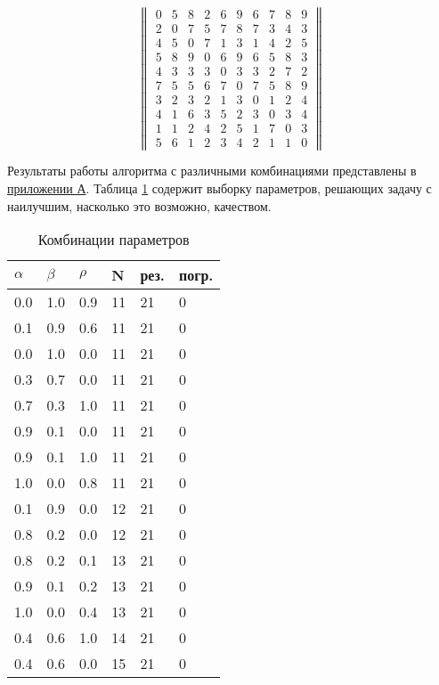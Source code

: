 \begin{equation}\label{math:class1}
    \begin{Vmatrix}
        0 & 5 & 8 & 2 & 6 & 9 & 6 & 7 & 8 & 9 \\
        2 & 0 & 7 & 5 & 7 & 8 & 7 & 3 & 4 & 3 \\
        4 & 5 & 0 & 7 & 1 & 3 & 1 & 4 & 2 & 5 \\
        5 & 8 & 9 & 0 & 6 & 9 & 6 & 5 & 8 & 3 \\
        4 & 3 & 3 & 3 & 0 & 3 & 3 & 2 & 7 & 2 \\
        7 & 5 & 5 & 6 & 7 & 0 & 7 & 5 & 8 & 9 \\
        3 & 2 & 3 & 2 & 1 & 3 & 0 & 1 & 2 & 4 \\
        4 & 1 & 6 & 3 & 5 & 2 & 3 & 0 & 3 & 4 \\
        1 & 1 & 2 & 4 & 2 & 5 & 1 & 7 & 0 & 3 \\
        5 & 6 & 1 & 2 & 3 & 4 & 2 & 1 & 1 & 0
    \end{Vmatrix} 
\end{equation}

Результаты работы алгоритма с различными комбинациями представлены в \hyperref[sec:fig1]{приложении А}. Таблица \ref{tab:class1} содержит выборку параметров, решающих задачу с наилучшим, насколько это возможно, качеством.

\begin{table}[!h]
\centering
    \caption{Комбинации параметров}
    \renewcommand{\arraystretch}{1.15}
    \begin{tabular}{||p{}p{}p{}p{}p{}p{}||}
        \hline
        $\alpha$ & $\beta$ & $\rho$ & N & рез. & погр. \\ \hline\hline
        0.0 & 1.0 & 0.9 & 11 & 21 & 0 \\ 
        0.1 & 0.9 & 0.6 & 11 & 21 & 0 \\ 
        0.0 & 1.0 & 0.0 & 11 & 21 & 0 \\ 
        0.3 & 0.7 & 0.0 & 11 & 21 & 0 \\ 
        0.7 & 0.3 & 1.0 & 11 & 21 & 0 \\ 
        0.9 & 0.1 & 0.0 & 11 & 21 & 0 \\ 
        0.9 & 0.1 & 1.0 & 11 & 21 & 0 \\ 
        1.0 & 0.0 & 0.8 & 11 & 21 & 0 \\ 
        0.1 & 0.9 & 0.0 & 12 & 21 & 0 \\ 
        0.8 & 0.2 & 0.0 & 12 & 21 & 0 \\ 
        0.8 & 0.2 & 0.1 & 13 & 21 & 0 \\ 
        0.9 & 0.1 & 0.2 & 13 & 21 & 0 \\ 
        1.0 & 0.0 & 0.4 & 13 & 21 & 0 \\ 
        0.4 & 0.6 & 1.0 & 14 & 21 & 0 \\ 
        0.4 & 0.6 & 0.0 & 15 & 21 & 0 \\ 
        \hline
    \end{tabular}
\label{tab:class1}
\end{table}

